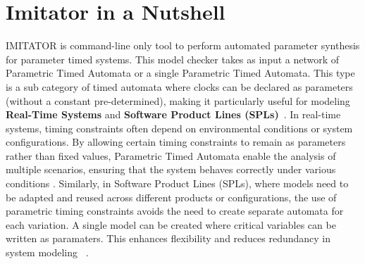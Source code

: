 

\section{Imitator in a Nutshell}

IMITATOR is command-line only tool to perform automated parameter synthesis for parameter timed systems. This model checker takes as input a network of Parametric Timed Automata or a single Parametric Timed Automata. This type is a sub category of timed automata where clocks can be declared as parameters (without a constant pre-determined), making it particularly useful for modeling \textbf{Real-Time Systems} and \textbf{Software Product Lines (SPLs)}~\cite{IMITATOR}. In real-time systems, timing constraints often depend on environmental conditions or system configurations. By allowing certain timing constraints to remain as parameters rather than fixed values, Parametric Timed Automata enable the analysis of multiple scenarios, ensuring that the system behaves correctly under various conditions \cite{RealTimeSystems}.
Similarly, in Software Product Lines (SPLs), where models need to be adapted and reused across different products or configurations, the use of parametric timing constraints avoids the need to create separate automata for each variation. A single model can be created where critical variables can be written as paramaters. This enhances flexibility and reduces redundancy in system modeling ~\cite{SPL}.


